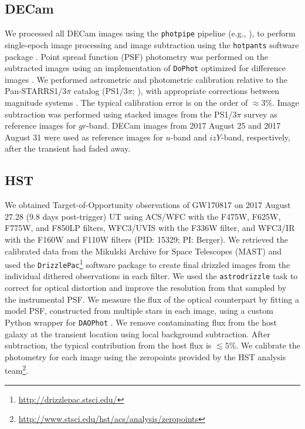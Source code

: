 \subsection{DECam}
\label{sec:ch5_data}
We processed all DECam images using the {\tt photpipe} pipeline (e.g., \citealt{Rest05+,Rest+14}), to perform single-epoch image processing and image subtraction using the {\tt hotpants} software package \citep{Becker2015}. Point spread function (PSF) photometry was performed on the subtracted images using an implementation of {\tt DoPhot} optimized for difference images \citep{Schechter+93}. We performed astrometric and photometric calibration relative to the Pan-STARRS1/$3\pi$ catalog (PS1/$3\pi$; \citealt{Chambers+16}), with appropriate corrections between magnitude systems \citep{Scolnic+15}. The typical calibration error is on the order of $\approx3\%$. Image subtraction was performed using stacked images from the PS1/$3\pi$ survey as reference images for $gr$-band. DECam images from 2017 August 25 and 2017 August 31 were used as reference images for $u$-band and $izY$-band, respectively, after the transient had faded away.

\subsection{HST}
\label{sec:ch5_data_HST}
We obtained \HST Target-of-Opportunity observations of GW170817 on 2017 August 27.28 (9.8 days post-trigger) UT using ACS/WFC with the F475W, F625W, F775W, and F850LP filters, WFC3/UVIS with the F336W filter, and WFC3/IR with the F160W and F110W filters (PID: 15329; PI: Berger).  We retrieved the calibrated data from the Mikulski Archive for Space Telescopes (MAST) and used the {\tt DrizzlePac}\footnote{\url{http://drizzlepac.stsci.edu/}} software package to create final drizzled images from the individual dithered observations in each filter.  We used the {\tt astrodrizzle} task to correct for optical distortion and improve the resolution from that sampled by the instrumental PSF. We measure the flux of the optical counterpart by fitting a model PSF, constructed from multiple stars in each image, using a custom Python wrapper for {\tt DAOPhot} \citep{Stetson1987}. We remove contaminating flux from the host galaxy at the transient location using local background subtraction. After subtraction, the typical contribution from the host flux is $\lesssim5\%$. We calibrate the photometry for each image using the zeropoints provided by the HST analysis team\footnote{\url{http://www.stsci.edu/hst/acs/analysis/zeropoints}}.

